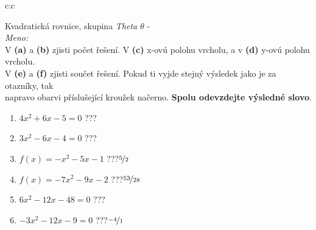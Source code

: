 \documentclass[10pt]{report}
\begin{document}
\clearpage
\thispagestyle{empty}
\begin{tabular}{c:c}
\begin{minipage}[c][99mm][t]{0.49\linewidth}
\begin{center}
\vspace{7mm}
{\huge Kvadratická rovnice, skupina \textit{Theta $\theta$} -}\\[4.5mm]
\textit{Meno:}\phantom{xxxxxxxxxxxxxxxxxxxxxxxxxxxxxxxxxxxxxxxxxxxxxxxxxxxxxxxxxxxxxxxxx}\\[3.5mm]
V \textbf{(a)} a \textbf{(b)} zjisti počet řešení. V \textbf{(c)} x-ovú polohu vrcholu, a v \textbf{(d)} y-ovú polohu vrcholu.\\V \textbf{(e)} a \textbf{(f)} zjisti součet řešení. Pokud ti vyjde stejný výsledek jako je za otazníky, tak\\napravo obarvi příslušející kroužek načerno. \textbf{Spolu odevzdejte výsledné slovo}.\\[3mm]
\begin{minipage}{0.77\linewidth}
\begin{center}
\begin{varwidth}{\textwidth}
\begin{enumerate}
\large
\item $4x^2+6x-5=0$\quad \dotfill\; ???\;\dotfill {}
\item $3x^2-6x-4=0$\quad \dotfill\; ???\;\dotfill {}
\item $f(x)=-x^2-5x-1$\quad \dotfill\; ???\;\dotfill \quad $\nicefrac{5}{2}$
\item $f(x)=-7x^2-9x-2$\quad \dotfill\; ???\;\dotfill \quad $\nicefrac{53}{28}$
\item $6x^2-12x-48=0$\quad \dotfill\; ???\;\dotfill {}
\item $-3x^2-12x-9=0$\quad \dotfill\; ???\;\dotfill \quad $\nicefrac{-4}{1}$
\end{enumerate}
\end{varwidth}
\end{center}
\end{minipage}

\end{center}
\end{minipage}
\end{tabular}
\end{document}
